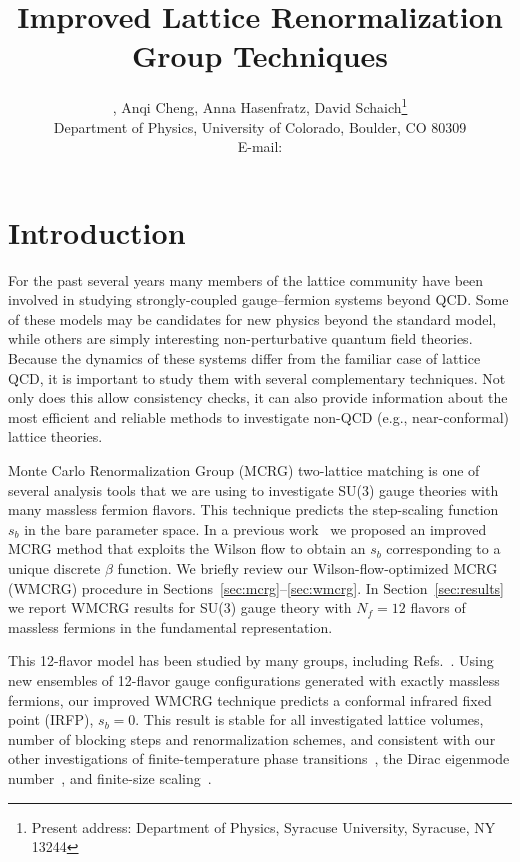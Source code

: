 \documentclass{PoS}
\title{Improved Lattice Renormalization Group Techniques}
\author{\speaker{Gregory Petropoulos}, Anqi Cheng, Anna Hasenfratz, David Schaich\footnote{Present address: Department of Physics, Syracuse University, Syracuse, NY 13244} \\
        Department of Physics, University of Colorado, Boulder, CO 80309 \\
        E-mail: \email{gregory.petropoulos@colorado.edu}}
\newcommand{\be}{\ensuremath{\beta} }
\newcommand{\secref}[1]{Section~\ref{#1}}
\begin{document}
\section{Introduction} %
For the past several years many members of the lattice community have been involved in studying strongly-coupled gauge--fermion systems beyond QCD.
Some of these models may be candidates for new physics beyond the standard model, while others are simply interesting non-perturbative quantum field theories.
Because the dynamics of these systems differ from the familiar case of lattice QCD, it is important to study them with several complementary techniques.
Not only does this allow consistency checks, it can also provide information about the most efficient and reliable methods to investigate non-QCD (e.g., near-conformal) lattice theories.

Monte Carlo Renormalization Group (MCRG) two-lattice matching is one of several analysis tools that we are using to investigate SU(3) gauge theories with many massless fermion flavors.
This technique predicts the step-scaling function $s_b$ in the bare parameter space.
In a previous work~\cite{Petropoulos:2012mg} we proposed an improved MCRG method that exploits the Wilson flow to obtain an $s_b$ corresponding to a unique discrete \be function.
We briefly review our Wilson-flow-optimized MCRG (WMCRG) procedure in Sections~\ref{sec:mcrg}--\ref{sec:wmcrg}.
In \secref{sec:results} we report WMCRG results for SU(3) gauge theory with $N_f = 12$ flavors of massless fermions in the fundamental representation.

This 12-flavor model has been studied by many groups, including Refs.~\cite{Appelquist:2009ty, Deuzeman:2009mh, Fodor:2011tu, Appelquist:2011dp, Hasenfratz:2011xn, DeGrand:2011cu, Cheng:2011ic, Jin:2012dw, Lin:2012iw, Aoki:2012eq, Fodor:2012uw, Fodor:2012et, Itou:2012qn, Cheng:2013eu, Aoki:2013pca, Hasenfratz:2013uha, Hasenfratz:2013eka, Cheng:2013bca}.
Using new ensembles of 12-flavor gauge configurations generated with exactly massless fermions, our improved WMCRG technique predicts a conformal infrared fixed point (IRFP), $s_b = 0$.
This result is stable for all investigated lattice volumes, number of blocking steps and renormalization schemes, and consistent with our other investigations of finite-temperature phase transitions~\cite{Schaich:2012fr, Hasenfratz:2013uha}, the Dirac eigenmode number~\cite{Cheng:2013eu, Cheng:2013bca}, and finite-size scaling~\cite{Hasenfratz:2013eka}.
\end{document}
